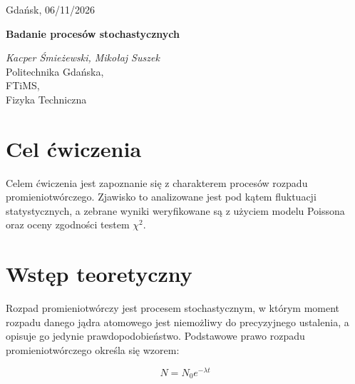 \documentclass[a4paper,12pt]{article} %
\newcommand{\rTitle}{Badanie procesów stochastycznych}
\newcommand{\studentName}{Kacper Śmieżewski, Mikołaj Suszek}
\newcommand{\faculty}{FTiMS}
\newcommand{\fieldOfStudy}{Fizyka Techniczna}
\newcommand{\raportDate}{06/11/2026}
\begin{document}
    \begin{flushright}
    Gdańsk, \raportDate
    \end{flushright}
    \vspace{12pt}
    \textbf{\rTitle}\\
    \begin{flushleft}
      \textit{\studentName}\\
      Politechnika Gdańska,\\
      \faculty,\\ 
      \fieldOfStudy
    \end{flushleft}
\vspace{24pt}

\renewcommand{\thesection}{\Roman{section}}
\addtolength{\cftsecnumwidth}{1em}

\begin{abstract}
Celem doświadczenia było zbadanie stochastycznego 
  charakteru promieniowania tła.
  Poddano analizie próbę 200 pomiarów promieniowania $\gamma$,
  z których każdy trwał 7 sekund.

  Na podstawie zebranych danych wyznaczono wartość średnią
  oraz wariancję, a następnie za pomocą
  testu statystycznego $\chi^2 = 6.1360$ zweryfikowano hipotezę 
  o zgodności otrzymanego rozkładu empirycznego
  z teoretycznym rozkładem Poissona.
\end{abstract}

\section{Cel ćwiczenia}
Celem ćwiczenia jest zapoznanie się z charakterem procesów rozpadu
promieniotwórczego.
Zjawisko to analizowane jest pod kątem fluktuacji statystycznych,
a zebrane wyniki weryfikowane są z użyciem modelu Poissona
oraz oceny zgodności testem $\chi^2$.

\section{Wstęp teoretyczny}
Rozpad promieniotwórczy jest procesem stochastycznym, 
w którym moment rozpadu danego jądra atomowego jest niemożliwy
do precyzyjnego ustalenia, a opisuje go jedynie prawdopodobieństwo.
Podstawowe prawo rozpadu promieniotwórczego określa się wzorem\cite{fw}:

\begin{equation}
N = N_0 e^{-\lambda t}
\end{equation}
\end{document}
